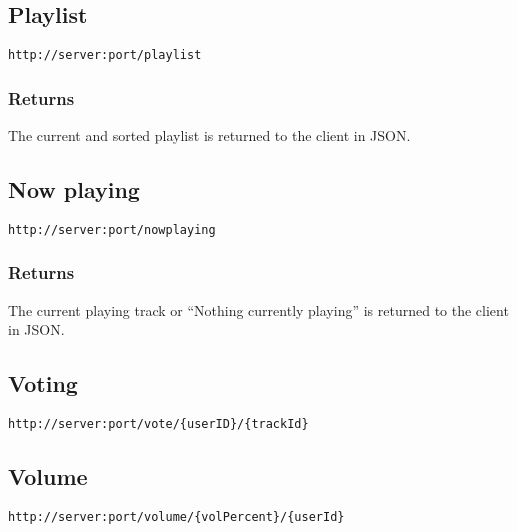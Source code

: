 \subsection{Playlist}

\begin{lstlisting}[label={lst:endpoint_playlist}, caption={Text surrounded by curly brackets are parameters.}]
http://server:port/playlist
\end{lstlisting}

\subsubsection{Returns}
The current and sorted playlist is returned to the client in JSON.

\subsection{Now playing}

\begin{lstlisting}[label={lst:endpoint_nowplaying}, caption={Text surrounded by curly brackets are parameters.}]
http://server:port/nowplaying
\end{lstlisting}

\subsubsection{Returns}
The current playing track or \enquote{Nothing currently playing} is returned to the client in JSON.

\subsection{Voting}

\begin{lstlisting}[label={lst:endpoint_vote}, caption={Text surrounded by curly brackets are parameters.}]
http://server:port/vote/{userID}/{trackId}
\end{lstlisting}


\subsection{Volume}

\begin{lstlisting}[label={lst:endpoint_volume}, caption={Text surrounded by curly brackets are parameters.}]
http://server:port/volume/{volPercent}/{userId}
\end{lstlisting}

